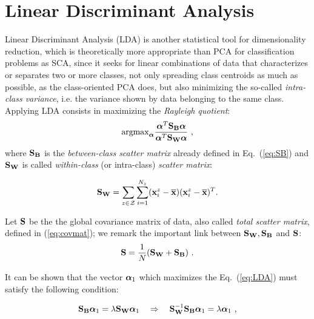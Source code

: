 \section{Linear Discriminant Analysis}

Linear Discriminant Analysis (LDA) is another statistical tool for dimensionality reduction, which is theoretically more appropriate than PCA for classification problems as SCA, since it seeks for linear combinations of data that characterizes or separates two or more classes, not only spreading class centroids as much as possible, as the class-oriented PCA does, but also minimizing the so-called {\em intra-class variance}, i.e. the variance shown by data belonging to the same class. Applying LDA consists in maximizing the {\em Rayleigh quotient}:
 \begin{equation}\label{eq:LDA}
 \mathrm{argmax}_{\AAlpha} \frac{\AAlpha^T \SB \AAlpha}{\AAlpha^T \SW \AAlpha} \mbox{ ,}
 \end{equation}
where $\SB$ is the {\em between-class scatter matrix} already defined in Eq.~(\ref{eq:SB}) and $\SW$ is called 
{\em within-class} (or intra-class) {\em scatter matrix}:

\begin{equation}
\SW = \sum_{\sensVar\in\sensVarSet}\sum_{i=1}^{\numTraces}(\sss{i}-\mmmX)(\sss{i}-\mmmX)^T \mbox{.}
\end{equation}


\begin{remark}
Let $\covmat$ be the the global covariance matrix of data, also called {\em total scatter matrix}, defined in (\ref{eq:covmat}); we remark the important link between $\SW,\SB$ and $\covmat$:
\begin{equation}
\covmat = \frac{1}{\numTraces[]}(\SW + \SB) \mbox{ .}
\end{equation}
\end{remark}

It can be shown that the vector $\AAlpha_1$ which maximizes the Eq.~(\ref{eq:LDA}) must satisfy the following condition:

\begin{equation}\label{eq:genEVprob}
\SB\AAlpha_1 = \lambda \SW \AAlpha_1 \quad \Rightarrow \quad \SW^{-1}\SB\AAlpha_1 = \lambda\AAlpha_1 \mbox{ ,}
\end{equation}

